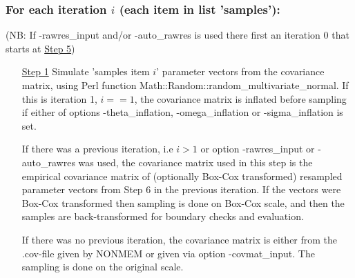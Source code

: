 \subsubsection*{For each iteration $i$ (each item in list 'samples'):}
(NB: If -rawres\_input and/or -auto\_rawres is used there first an iteration 0 that starts at \underline{Step 5})
\begin{itemize}
\item[\underline{Step 1}] 
Simulate 'samples item $i$' parameter vectors from the 
covariance matrix, using Perl function Math::Random::random\_multivariate\_normal.
If this is iteration 1, $i==1$, 
the covariance matrix is inflated before sampling 
if either of options -theta\_inflation, -omega\_inflation or -sigma\_inflation is set. 

\noindent If there was a previous iteration, i.e $i>1$ or option -rawres\_input or -auto\_rawres was used, 
the covariance matrix used in this step is the
empirical covariance matrix of (optionally Box-Cox transformed) resampled parameter vectors from
Step 6 in the previous iteration. 
If the vectors were Box-Cox transformed then
sampling is done on Box-Cox scale, and 
then the samples are back-transformed for boundary checks and evaluation.

\noindent If there was no previous iteration, the covariance matrix is either from
the .cov-file given by NONMEM or given via option -covmat\_input.
The sampling is done on the original scale. 


\end{itemize}
